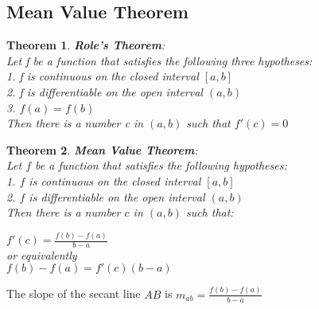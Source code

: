 \documentclass[10pt,a4paper]{article}
\newtheorem{theorem}{Theorem}
\begin{document}
\subsection{Mean Value Theorem}
\begin{theorem}
	\textbf{Role's Theorem}:
	\\Let \textit{f} be a function that satisfies the following three hypotheses:
	\\1. \textit{f} is continuous on the closed interval $[a,b]$
	\\2. \textit{f} is differentiable on the open interval $(a,b)$
	\\3. $f(a) = f(b)$
	\\ Then there is a number \textit{c} in $(a,b)$ such that $f'(c)=0$	
\end{theorem}
\begin{theorem}
	\textbf{Mean Value Theorem}:
	\\Let $f$ be a function that satisfies the following hypotheses:
	\\1. $f$ is continuous on the closed interval $[a,b]$
	\\2. $f$ is differentiable on the open interval $(a,b)$
	\\ Then there is a number $c$ in $(a,b)$ such that:
	\begin{center}
		$f'(c)= \frac{f(b)-f(a)}{b-a}$
		\\or equivalently
		\\$f(b)-f(a) = f'(c)(b-a)$
	\end{center}
\end{theorem}
The slope of the secant line $AB$ is $m_{ab}=\frac{f(b)-f(a)}{b-a}$
\end{document}
